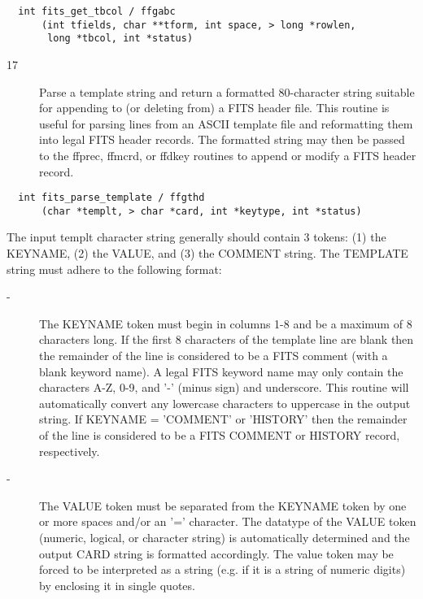 \begin{verbatim}
  int fits_get_tbcol / ffgabc
      (int tfields, char **tform, int space, > long *rowlen,
       long *tbcol, int *status)
\end{verbatim}

\begin{description}
\item[17] Parse a template string and return a formatted 80-character string
    suitable for appending to (or deleting from) a FITS header file.
    This routine is useful for parsing lines from an ASCII template file
    and reformatting them into legal FITS header records.  The formatted
    string may then be passed to the ffprec, ffmcrd, or ffdkey routines
   to append or modify a FITS header record.
\end{description}

\begin{verbatim}
  int fits_parse_template / ffgthd
      (char *templt, > char *card, int *keytype, int *status)
\end{verbatim}
    The input templt character string generally should contain 3 tokens:
    (1) the KEYNAME, (2) the VALUE, and (3) the COMMENT string.  The
    TEMPLATE string must adhere to the following format:


\begin{description}
\item[- ]     The KEYNAME token must begin in columns 1-8 and be a maximum  of 8
        characters long.  If the first 8 characters of the template line are
        blank then the remainder of the line is considered to be a FITS comment
        (with a blank keyword name).  A legal FITS keyword name may only
        contain the characters A-Z, 0-9, and '-' (minus sign) and
        underscore.  This routine will automatically convert any lowercase
        characters to uppercase in the output string.  If KEYNAME = 'COMMENT'
        or 'HISTORY' then the remainder of the line is considered to be a FITS
       COMMENT or HISTORY record, respectively.
\end{description}


\begin{description}
\item[- ]     The VALUE token must be separated from the KEYNAME token by one or more
        spaces and/or an '=' character.  The datatype of the VALUE token
        (numeric, logical, or character string) is automatically determined
        and  the output CARD string is formatted accordingly.  The value
        token may be forced to be interpreted as a string (e.g. if it is a
       string of numeric digits) by enclosing it in single quotes.
\end{description}


